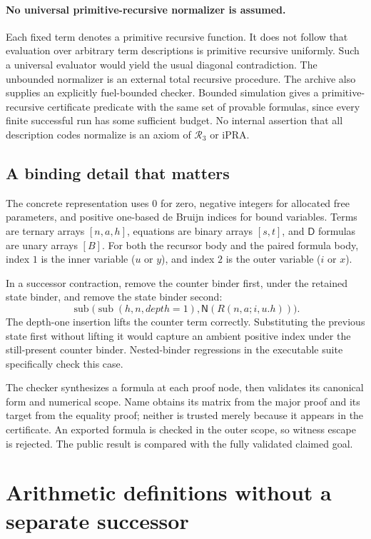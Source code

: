 \documentclass[11pt,letterpaper]{article}
\theoremstyle{definition}\newtheorem{definition}[theorem]{Definition}
\theoremstyle{remark}\newtheorem{remark}[theorem]{Remark}
\newcommand{\RN}{\mathcal R_3}
\newcommand{\NF}{\mathsf N}
\newcommand{\DD}{\mathsf D}
\begin{document}
\paragraph{No universal primitive-recursive normalizer is assumed.}
Each fixed term denotes a primitive recursive function. It does not
follow that evaluation over arbitrary term descriptions is primitive
recursive uniformly. Such a universal evaluator would yield the usual
diagonal contradiction. The unbounded normalizer is an external total
recursive procedure. The archive also supplies an explicitly fuel-bounded
checker. Bounded simulation gives a primitive-recursive certificate
predicate with the same set of provable formulas, since every finite
successful run has some sufficient budget. No internal assertion that
all description codes normalize is an axiom of $\RN$ or iPRA.

\subsection{A binding detail that matters}
The concrete representation uses $0$ for zero, negative integers for
allocated free parameters, and positive one-based de Bruijn indices
for bound variables. Terms are ternary arrays $[n,a,h]$, equations
are binary arrays $[s,t]$, and $\DD$ formulas are unary arrays $[B]$.
For both the recursor body and the paired formula body, index $1$ is
the inner variable ($u$ or $y$), and index $2$ is the outer variable
($i$ or $x$).

In a successor contraction, remove the counter binder first, under the
retained state binder, and remove the state binder second:
\[
 \operatorname{sub}\bigl(
   \operatorname{sub}(h,n,\mathit{depth}=1),
   \NF(R(n,a;i,u.h))\bigr).
\]
The depth-one insertion lifts the counter term correctly. Substituting
the previous state first without lifting it would capture an ambient
positive index under the still-present counter binder. Nested-binder
regressions in the executable suite specifically check this case.

The checker synthesizes a formula at each proof node, then validates
its canonical form and numerical scope. Name obtains its matrix from
the major proof and its target from the equality proof; neither is
trusted merely because it appears in the certificate. An exported
formula is checked in the outer scope, so witness escape is rejected.
The public result is compared with the fully validated claimed goal.

\section{Arithmetic definitions without a separate successor}\label{sec:arithmetic-defs}
\end{document}
